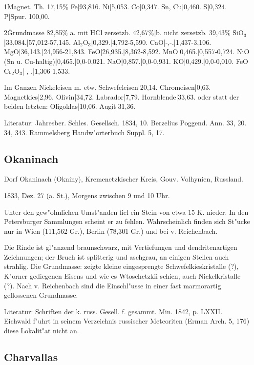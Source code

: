 \documentclass[a4paper, 11pt, oneside]{article}
\begin{document}
1\. Magnet. Th. 17,15\%  
Fe|93,816.  
Ni|5,053.  
Co|0,347.  
Sn, Cu|0,460.  
S|0,324.  
P|Spur.  
100,00.

2\. Grundmasse 82,85\%  
a. mit HCl zersetzb. 42,67\%|b. nicht zersetzb. 39,43\%  
SiO$_{3}$|33,084.|57,012-57,145.  
Al$_{2}$O$_{3}$|0,329.|4,792-5,590.  
CaO|-,-.|1,437-3,106.  
MgO|36,143.|24,956-21,843.
FeO|26,935.|8,362-8,592.
MnO|0,465.|0,557-0,724.  
NiO (Sn u. Cu-haltig)|0,465.|0,0-0,021.  
NaO|0,857.|0,0-0,931.  
KO|0,429.|0,0-0,010.  
FeO Cr$_{2}$O$_{3}$|-,-.|1,306-1,533.

Im Ganzen  
Nickeleisen m. etw. Schwefeleisen|20,14.  
Chromeisen|0,63.  
Magnetkies|2,96.  
Olivin|34,72.  
Labrador|7,79.  
Hornblende|33,63.  
oder statt der beiden letzten:  
Oligoklas|10,06.  
Augit|31,36.

Literatur: Jahresber. Schles. Gesellsch. 1834, 10. Berzelius Poggend. Ann. 33, 20. 34, 343. Rammelsberg Handw"orterbuch Suppl. 5, 17.

\subsection{Okaninach}

Dorf Okaninach (Okniny), Kremenetzkischer Kreis, Gouv. Volhynien, Russland.

1833, Dez. 27 (a. St.), Morgens zwischen 9 und 10 Uhr.

Unter den gew"ohnlichen Umst"anden fiel ein Stein von etwa 15 K. nieder. In den Petersburger Sammlungen scheint er zu fehlen. Wahrscheinlich finden sich St"ucke nur in Wien (111,562 Gr.), Berlin (78,301 Gr.) und bei v. Reichenbach.

Die Rinde ist gl"anzend braunschwarz, mit Vertiefungen und dendritenartigen Zeichnungen; der Bruch ist splitterig und aschgrau, an einigen Stellen auch strahlig. Die Grundmasse: zeigte kleine eingesprengte Schwefelkieskristalle (?), K"orner gediegenen Eisens und wie es Wtoschetzkii schien, auch Nickelkristalle (?). Nach v. Reichenbach sind die Einschl"usse in einer fast marmorartig geflossenen Grundmasse.

Literatur: Schriften der k. russ. Gesell. f. gesammt. Min. 1842, p. LXXII. Eichwald f"uhrt in seinem Verzeichnis russischer Meteoriten (Erman Arch. 5, 176) diese Lokalit"at nicht an.

\subsection{Charvallas}
\end{document}
